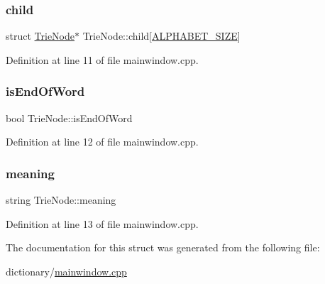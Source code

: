 \subsubsection{\texorpdfstring{child}{child}}
{\footnotesize\ttfamily struct \hyperlink{struct_trie_node}{Trie\+Node}$\ast$ Trie\+Node\+::child\mbox{[}\hyperlink{mainwindow_8cpp_afb525552ed6d204d5636ad18ccf5355f}{A\+L\+P\+H\+A\+B\+E\+T\+\_\+\+S\+I\+ZE}\mbox{]}}



Definition at line 11 of file mainwindow.\+cpp.

\mbox{\label{struct_trie_node_ab2732ce1e141346865d997859836d663}} 
\subsubsection{\texorpdfstring{is\+End\+Of\+Word}{isEndOfWord}}
{\footnotesize\ttfamily bool Trie\+Node\+::is\+End\+Of\+Word}



Definition at line 12 of file mainwindow.\+cpp.

\mbox{\label{struct_trie_node_a74b66d86de58c281d357f24e736ad953}} 
\subsubsection{\texorpdfstring{meaning}{meaning}}
{\footnotesize\ttfamily string Trie\+Node\+::meaning}



Definition at line 13 of file mainwindow.\+cpp.



The documentation for this struct was generated from the following file\+:\begin{DoxyCompactItemize}
\item 
dictionary/\hyperlink{mainwindow_8cpp}{mainwindow.\+cpp}\end{DoxyCompactItemize}
